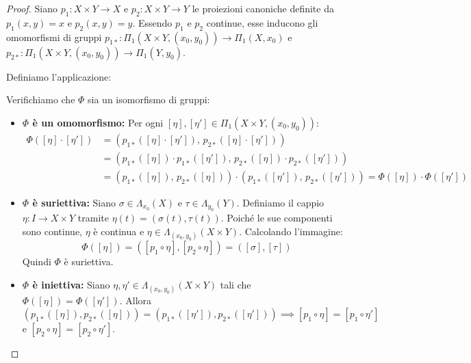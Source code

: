 \begin{proof}
Siano $p_1: X \times Y \to X$ e $p_2: X \times Y \to Y$ le proiezioni canoniche definite da $p_1(x,y) = x$ e $p_2(x,y) = y$.
Essendo $p_1$ e $p_2$ continue, esse inducono gli omomorfismi di gruppi $p_{1*}: \Pi_1(X \times Y, (x_0, y_0)) \to \Pi_1(X, x_0)$ e $p_{2*}: \Pi_1(X \times Y, (x_0, y_0)) \to \Pi_1(Y, y_0)$.

Definiamo l'applicazione:

Verifichiamo che $\Phi$ sia un isomorfismo di gruppi:

\begin{itemize}
    \item \textbf{$\Phi$ è un omomorfismo:} Per ogni $[\eta], [\eta'] \in \Pi_1(X \times Y, (x_0, y_0))$:
    \[
    \begin{aligned}
        \Phi([\eta] \cdot [\eta']) &= (p_{1*}([\eta] \cdot [\eta']), \, p_{2*}([\eta] \cdot [\eta'])) \\
        &= (p_{1*}([\eta]) \cdot p_{1*}([\eta']), \, p_{2*}([\eta]) \cdot p_{2*}([\eta'])) \\
        &= (p_{1*}([\eta]), \, p_{2*}([\eta])) \cdot (p_{1*}([\eta']), \, p_{2*}([\eta'])) = \Phi([\eta]) \cdot \Phi([\eta'])
    \end{aligned}
    \]

    \item \textbf{$\Phi$ è suriettiva:} Siano $\sigma \in \Lambda_{x_0}(X)$ e $\tau \in \Lambda_{y_0}(Y)$.
    Definiamo il cappio $\eta: I \to X \times Y$ tramite $\eta(t) = (\sigma(t), \tau(t))$. Poiché le sue componenti sono continue, $\eta$ è continua e $\eta \in \Lambda_{(x_0, y_0)}(X \times Y)$.
    Calcolando l'immagine:
    \[
    \Phi([\eta]) = ([p_1 \circ \eta], [p_2 \circ \eta]) = ([\sigma], [\tau])
    \]
    Quindi $\Phi$ è suriettiva.

    \item \textbf{$\Phi$ è iniettiva:} Siano $\eta, \eta' \in \Lambda_{(x_0, y_0)}(X \times Y)$ tali che $\Phi([\eta]) = \Phi([\eta'])$.
    Allora $(p_{1*}([\eta]), p_{2*}([\eta])) = (p_{1*}([\eta']), p_{2*}([\eta'])) \implies [p_1 \circ \eta] = [p_1 \circ \eta']$ e $[p_2 \circ \eta] = [p_2 \circ \eta']$.
    

\end{itemize}
\end{proof}

